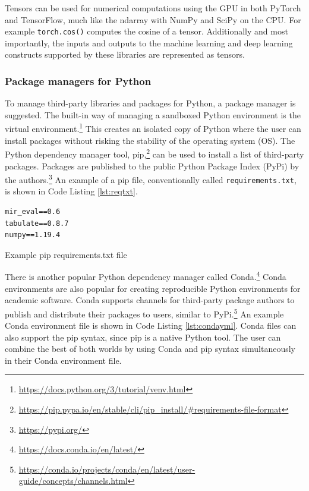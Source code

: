 \documentclass[report.tex]{subfiles}
\begin{document}
Tensors can be used for numerical computations using the GPU in both PyTorch and TensorFlow, much like the ndarray with NumPy and SciPy on the CPU. For example \Verb#torch.cos()# computes the cosine of a tensor. Additionally and most importantly, the inputs and outputs to the machine learning and deep learning constructs supported by these libraries are represented as tensors.

\subsubsection{Package managers for Python}

To manage third-party libraries and packages for Python, a package manager is suggested. The built-in way of managing a sandboxed Python environment is the virtual environment.\footnote{\url{https://docs.python.org/3/tutorial/venv.html}} This creates an isolated copy of Python where the user can install packages without risking the stability of the operating system (OS). The Python dependency manager tool, pip,\footnote{\url{https://pip.pypa.io/en/stable/cli/pip_install/\#requirements-file-format}} can be used to install a list of third-party packages. Packages are published to the public Python Package Index (PyPi) by the authors.\footnote{\url{https://pypi.org/}} An example of a pip file, conventionally called \Verb#requirements.txt#, is shown in Code Listing \ref{lst:reqtxt}.

\begin{listing}[ht]
\centering
\begin{BVerbatim}
mir_eval==0.6
tabulate==0.8.7
numpy==1.19.4
\end{BVerbatim}
	\caption{Example pip requirements.txt file}
	\label{lst:reqtxt}
\end{listing}

There is another popular Python dependency manager called Conda.\footnote{\url{https://docs.conda.io/en/latest/}} Conda environments are also popular for creating reproducible Python environments for academic software. Conda supports channels for third-party package authors to publish and distribute their packages to users, similar to PyPi.\footnote{\url{https://conda.io/projects/conda/en/latest/user-guide/concepts/channels.html}} An example Conda environment file is shown in Code Listing \ref{lst:condayml}. Conda files can also support the pip syntax, since pip is a native Python tool. The user can combine the best of both worlds by using Conda and pip syntax simultaneously in their Conda environment file.
\end{document}
